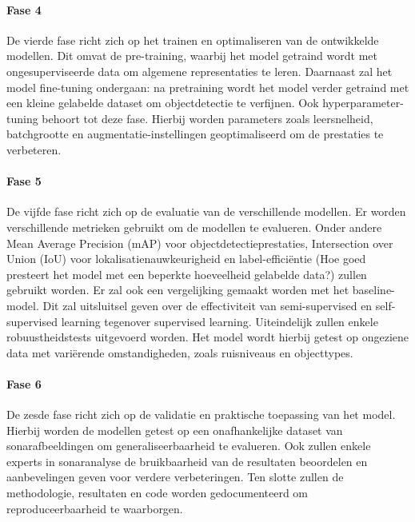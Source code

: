 \paragraph{Fase 4}

De vierde fase richt zich op het trainen en optimaliseren van de ontwikkelde modellen. Dit omvat de pre-training, waarbij het model getraind wordt met ongesuperviseerde data om algemene representaties te leren. Daarnaast zal het model fine-tuning ondergaan: na pretraining wordt het model verder getraind met een kleine gelabelde dataset om objectdetectie te verfijnen. Ook hyperparameter-tuning behoort tot deze fase. Hierbij worden parameters zoals leersnelheid, batchgrootte en augmentatie-instellingen geoptimaliseerd om de prestaties te verbeteren.

\paragraph{Fase 5}

De vijfde fase richt zich op de evaluatie van de verschillende modellen. Er worden verschillende metrieken gebruikt om de modellen te evalueren. Onder andere Mean Average Precision (mAP) voor objectdetectieprestaties, Intersection over Union (IoU) voor lokalisatienauwkeurigheid en label-efficiëntie (Hoe goed presteert het model met een beperkte hoeveelheid gelabelde data?) zullen gebruikt worden. Er zal ook een vergelijking gemaakt worden met het baseline-model. Dit zal uitsluitsel geven over de effectiviteit van semi-supervised en self-supervised learning tegenover supervised learning. Uiteindelijk zullen enkele robuustheidstests uitgevoerd worden. Het model wordt hierbij getest op ongeziene data met variërende omstandigheden, zoals ruisniveaus en objecttypes.

\paragraph{Fase 6}

De zesde fase richt zich op de validatie en praktische toepassing van het model. Hierbij worden de modellen getest op een onafhankelijke dataset van sonarafbeeldingen om generaliseerbaarheid te evalueren. Ook zullen enkele experts in sonaranalyse de bruikbaarheid van de resultaten beoordelen en aanbevelingen geven voor verdere verbeteringen. Ten slotte zullen de methodologie, resultaten en code worden gedocumenteerd om reproduceerbaarheid te waarborgen.

